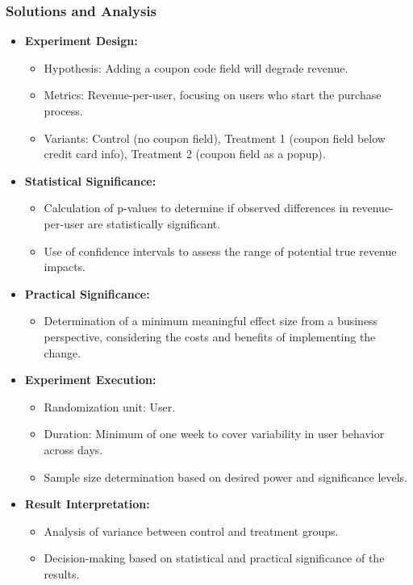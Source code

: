 \documentclass{article}
\begin{document}
\subsubsection*{Solutions and Analysis}
\begin{itemize}
    \item \textbf{Experiment Design:}
    \begin{itemize}
        \item Hypothesis: Adding a coupon code field will degrade revenue.
        \item Metrics: Revenue-per-user, focusing on users who start the purchase process.
        \item Variants: Control (no coupon field), Treatment 1 (coupon field below credit card info), Treatment 2 (coupon field as a popup).
    \end{itemize}

    \item \textbf{Statistical Significance:}
    \begin{itemize}
        \item Calculation of p-values to determine if observed differences in revenue-per-user are statistically significant.
        \item Use of confidence intervals to assess the range of potential true revenue impacts.
    \end{itemize}

    \item \textbf{Practical Significance:}
    \begin{itemize}
        \item Determination of a minimum meaningful effect size from a business perspective, considering the costs and benefits of implementing the change.
    \end{itemize}

    \item \textbf{Experiment Execution:}
    \begin{itemize}
        \item Randomization unit: User.
        \item Duration: Minimum of one week to cover variability in user behavior across days.
        \item Sample size determination based on desired power and significance levels.
    \end{itemize}

    \item \textbf{Result Interpretation:}
    \begin{itemize}
        \item Analysis of variance between control and treatment groups.
        \item Decision-making based on statistical and practical significance of the results.
    \end{itemize}
\end{itemize}
\end{document}
